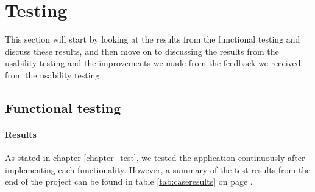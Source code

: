 \newpage

\section{Testing}\label{con_testing}
This section will start by looking at the results from the functional testing and discuss these results, and then move on to discussing the results from the usability testing and the improvements we made from the feedback we received from the usability testing.

\subsection{Functional testing}

\paragraph{Results}\hfill
\newline
As stated in chapter \ref{chapter_test}, we tested the application continuously after implementing each functionality. However, a summary of the test results from the end of the project can be found in table \ref{tab:caseresults} on page \pageref{tab:caseresults}.
